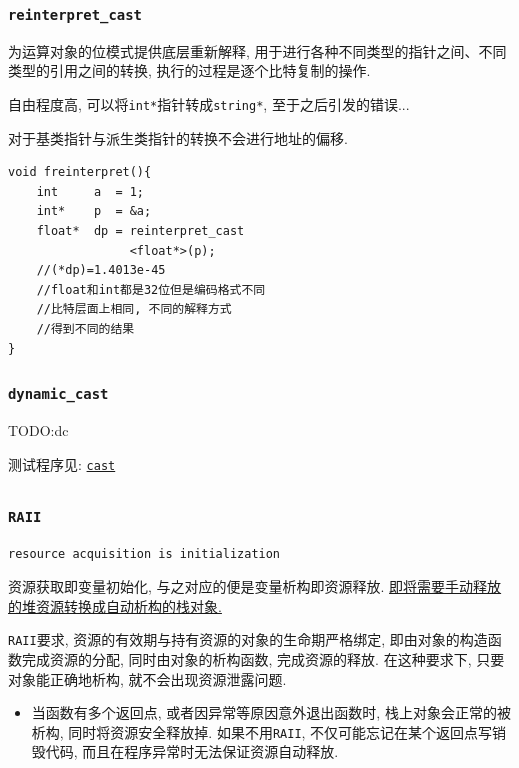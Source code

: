 \subsubsection{\tt{reinterpret\_cast}}
\begin{paracol}{2}
	\begin{leftcolumn}
		为运算对象的位模式提供底层重新解释, 用于进行各种不同类型的指针之间、不同类型的引用之间的转换, 
			执行的过程是逐个比特复制的操作.

		自由程度高, 可以将{\tt int*}指针转成{\tt string*}, 至于之后引发的错误...

		对于基类指针与派生类指针的转换不会进行地址的偏移. 
	\end{leftcolumn}	
	\begin{rightcolumn}
		\begin{lstlisting}[xleftmargin=2em,xrightmargin=2em]
void freinterpret(){
	int     a  = 1;
	int*    p  = &a;
	float*  dp = reinterpret_cast
				 <float*>(p);
	//(*dp)=1.4013e-45
	//float和int都是32位但是编码格式不同
	//比特层面上相同, 不同的解释方式
	//得到不同的结果
}
		\end{lstlisting}
	\end{rightcolumn}
\end{paracol}
\subsubsection{\tt{dynamic\_cast}}
TODO:dc

测试程序见: \href{https://github.com/wenqingqian/Obtuse/blob/main/test/cpp/c++11/cast.cpp}{\tt cast}
\subsection{\color{purple}{智能指针}}
\subsubsection{\tt RAII}

{\tt resource acquisition is initialization}

资源获取即变量初始化, 与之对应的便是变量析构即资源释放. \uline{即将需要手动释放的堆资源转换成自动析构的栈对象.}

{\tt RAII}要求, 资源的有效期与持有资源的对象的生命期严格绑定, 即由对象的构造函数完成资源的分配, 
	同时由对象的析构函数, 完成资源的释放. 在这种要求下, 只要对象能正确地析构, 就不会出现资源泄露问题.

\begin{itemize}
	\item 当函数有多个返回点, 或者因异常等原因意外退出函数时, 栈上对象会正常的被析构, 同时将资源安全释放掉. 
			如果不用{\tt RAII}, 不仅可能忘记在某个返回点写销毁代码, 而且在程序异常时无法保证资源自动释放.
\end{itemize}

